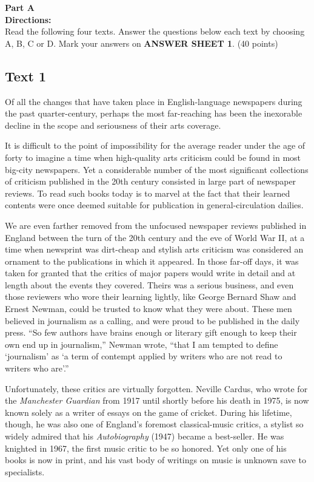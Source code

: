 \noindent
\textbf{Part A}\\
\textbf{Directions:}\\
Read the following four texts. Answer the questions below each text by
choosing A, B, C or
D. Mark your answers on
\textbf{ANSWER SHEET 1}. (40 points)



\subsection{Text 1}


Of all the changes that have taken place in English-language newspapers
during the past quarter-century, perhaps the most far-reaching has been
the inexorable decline in the scope and seriousness of their arts
coverage.

It is difficult to the point of impossibility for the average reader
under the age of forty to imagine a time when high-quality arts
criticism could be found in most big-city newspapers. Yet a considerable
number of the most significant collections of criticism published in the
20th century consisted in large part of newspaper
reviews. To read such books today is to marvel at the fact that their
learned contents were once deemed suitable for publication in
general-circulation dailies.

We are even farther removed from the unfocused newspaper reviews
published in England between the turn of the 20th
century and the eve of World War II, at a time when newsprint was
dirt-cheap and stylish arts criticism was considered an ornament to the
publications in which it appeared. In those far-off days, it was taken
for granted that the critics of major papers would write in detail and
at length about the events they covered. Theirs was a serious business,
and even those reviewers who wore their learning lightly, like George
Bernard Shaw and Ernest Newman, could be trusted to know what they were
about. These men believed in journalism as a calling, and were proud to
be published in the daily press. ``So few authors have brains enough or
literary gift enough to keep their own end up in journalism,'' Newman
wrote, ``that I am tempted to define `journalism' as `a term of contempt
applied by writers who are not read to writers who are'.''

Unfortunately, these critics are virtually forgotten. Neville Cardus,
who wrote for the \emph{Manchester Guardian} from 1917 until shortly
before his death in 1975, is now known solely as a writer of essays on
the game of cricket. During his lifetime, though, he was also one of
England's foremost classical-music critics, a stylist so widely admired
that his \emph{Autobiography} (1947) became a best-seller. He was
knighted in 1967, the first music critic to be so honored. Yet only one
of his books is now in print, and his vast body of writings on music is
unknown save to specialists.

